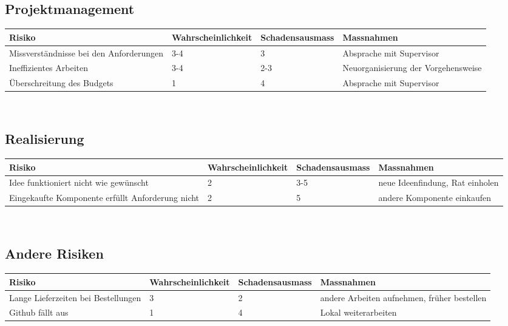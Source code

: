 \subsection{Projektmanagement}
\begin{table}[h]
\begin{tabular}{|p{3cm}|p{3cm}|p{3cm}|p{4cm}|}\hline
	
	\textbf{Risiko}	& 	\textbf{Wahrscheinlichkeit} & \textbf{Schadensausmass}  & \textbf{Massnahmen} \\\hline
		Missverständnisse bei den Anforderungen	&	3-4	&	3	& Absprache mit Supervisor  \\\hline
	Ineffizientes Arbeiten	&	3-4	&	2-3	& Neuorganisierung der Vorgehensweise  \\\hline
	
	Überschreitung des Budgets	&	1	&	4	& Absprache mit Supervisor  \\\hline
\end{tabular}\\
\end{table}

\subsection{Realisierung}
\begin{table}[h]
\begin{tabular}{|p{3cm}|p{3cm}|p{3cm}|p{4cm}|}\hline
	
	\textbf{Risiko}	& 	\textbf{Wahrscheinlichkeit} & \textbf{Schadensausmass}  & \textbf{Massnahmen} \\\hline
	
	Idee funktioniert nicht wie gewünscht	&	2	&	3-5	& neue Ideenfindung, Rat einholen  \\\hline
	Eingekaufte Komponente erfüllt Anforderung nicht	&	2	&	5	& andere Komponente einkaufen  \\\hline
\end{tabular}\\
\end{table}

\subsection{Andere Risiken}
\begin{table}[h]
\begin{tabular}{|p{3cm}|p{3cm}|p{3cm}|p{4cm}|}\hline
	
	\textbf{Risiko}	& 	\textbf{Wahrscheinlichkeit} & \textbf{Schadensausmass}  & \textbf{Massnahmen} \\\hline
	
	Lange Lieferzeiten bei Bestellungen	&	3	&	2	& andere Arbeiten aufnehmen, früher bestellen  \\\hline
	Github fällt aus	&	1	&	4	& Lokal weiterarbeiten  \\\hline
\end{tabular}\\
\end{table}

